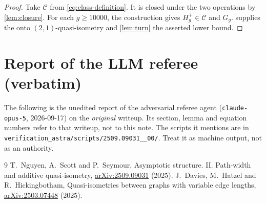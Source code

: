 \documentclass[11pt,a4paper]{article}
\theoremstyle{plain}
\theoremstyle{definition}
\theoremstyle{remark}
\newcommand{\cC}{\mathcal C}
\newcommand{\Gg}{G_g}
\newcommand{\Hp}{H_g^{+}}
\begin{document}
\label{pf:main}
\thmmain*
\begin{proof}
Take $\cC$ from \eqref{eq:class-definition}. It is closed under the two operations by \cref{lem:closure}. For each $g\ge10000$, the construction gives $\Hp\in\cC$ and $\Gg$.  supplies the onto $(2,1)$-quasi-isometry and \cref{lem:turn} the asserted lower bound.
\end{proof}

\section{Report of the LLM referee (verbatim)}\label{app:referee}

\begin{tcolorbox}[colback=gray!8,colframe=gray!50,boxrule=0.4pt,arc=2pt]
\small The following is the unedited report of the adversarial referee agent (\texttt{claude-opus-5}, 2026-09-17) on the \emph{original} writeup. Its section, lemma and equation numbers refer to that writeup, not to this note. The scripts it mentions are in \texttt{verification\_astra/scripts/2509.09031\_\_00/}. Treat it as machine output, not as an authority.
\end{tcolorbox}



\begin{thebibliography}{9}
\small
\setlength{\itemsep}{2pt}
 T.~Nguyen, A.~Scott and P.~Seymour, Asymptotic structure. II. Path-width and additive quasi-isometry, \href{https://arxiv.org/abs/2509.09031}{arXiv:2509.09031} (2025).
 J.~Davies, M.~Hatzel and R.~Hickingbotham, Quasi-isometries between graphs with variable edge lengths, \href{https://arxiv.org/abs/2503.07448}{arXiv:2503.07448} (2025).
\end{thebibliography}
\end{document}
